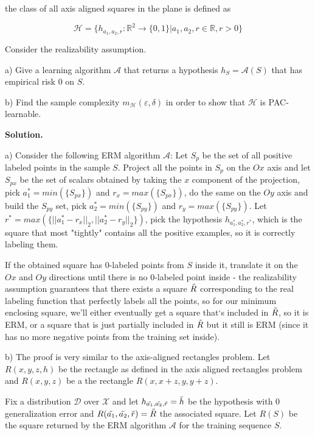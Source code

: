 \documentclass{article}
\newcommand{\<}{\langle}
\renewcommand{\>}{\rangle}
\theoremstyle{definition}
\begin{document}
the class of all axis aligned squares in the plane is defined as

$$\mathcal{H}=\{h_{a_1, a_2, r}:\mathbb{R}^2\to\{0,1\}|a_1, a_2, r\in \mathbb{R}, r>0\}$$

Consider the realizability assumption.

a) Give a learning algorithm $\mathcal{A}$ that returns a hypothesis $h_S=\mathcal{A}(S)$ that has empirical risk 0 on $S$.

b) Find the sample complexity $m_\mathcal{H}(\varepsilon, \delta)$ in order to show that $\mathcal{H}$ is PAC-learnable.

\textbf{Solution.}

a) Consider the following ERM algorithm $\mathcal{A}$: Let $S_p$ be the set of all positive labeled points in the sample $S$. Project all the points in $S_p$ on the $Ox$ axis and let $S_{px}$ be the set of scalars obtained by taking the $x$ component of the projection, pick $a_1^* = min(\{S_{px}\})$ and $r_x=max(\{S_{px}\})$, do the same on the $Oy$ axis and build the $S_{py}$ set, pick $a_2^*=min(\{S_{py}\})$ and $r_y=max(\{S_{py}\})$. Let $r^*=max(\{||a_1^*-r_x||_2, ||a_2^*-r_y||_2\})$, pick the hypothesis $h_{a_1^*, a_2^*, r^*}$, which is the square that most "tightly" contains all the positive examples, so it is correctly labeling them. 

If the obtained square has 0-labeled points from $S$ inside it, translate it on the $Ox$ and $Oy$ directions until there is no 0-labeled point inside - the realizability assumption guarantees that there exists a square $\Tilde{R}$ corresponding to the real labeling function that perfectly labels all the points, so for our minimum enclosing square, we'll either eventually get a square that`s included in $\Tilde{R}$, so it is ERM, or a square that is just partially included in $\Tilde{R}$ but it still is ERM (since it has no more negative points from the training set inside). 

b) The proof is very similar to the axis-aligned rectangles problem. Let $R(x,y,z,h)$ be the rectangle as defined in the axis aligned rectangles problem and $R(x,y,z)$ be a the rectangle $R(x, x+z, y, y+z)$.

Fix a distribution $\mathcal{D}$ over $\mathcal{X}$ and let $h_{\Tilde{a_1}, \Tilde{a_2}, \Tilde{r}}=\Tilde{h}$ be the hypothesis with 0 generalization error and $R(\Tilde{a_1}, \Tilde{a_2}, \Tilde{r}) = \Tilde{R}$ the associated square. Let $R(S)$ be the square returned by the ERM algorithm $\mathcal{A}$ for the training sequence $S$.
\end{document}
